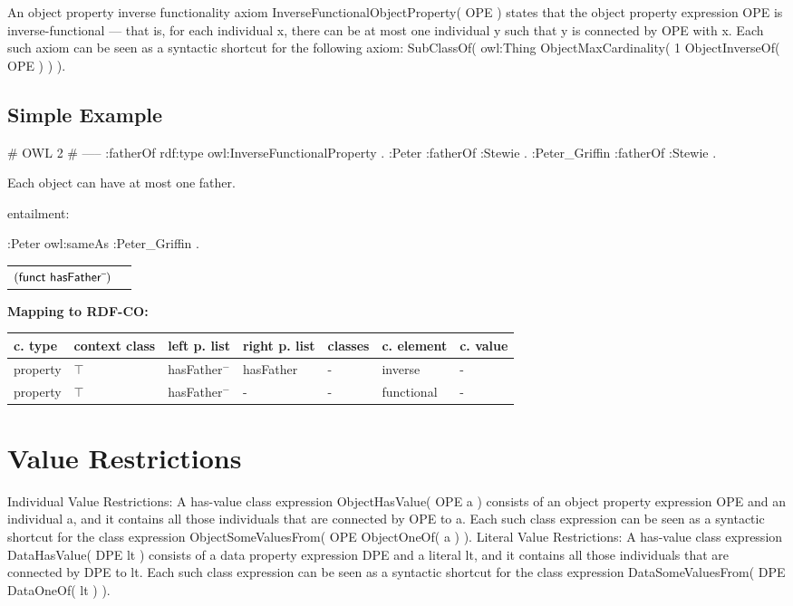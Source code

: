 \documentclass{llncs}
\newenvironment{gcotable}{
  \scriptsize
  \sffamily
  \vspace{0cm}
	\begin{center}
	\textbf{\vspace{0.4cm}Mapping to RDF-CO:} \\
  \begin{tabular}{l|l|l|l|l|l|l}
	\hline
  \textbf{c. type} & \textbf{context class} & \textbf{left p. list} & \textbf{right p. list} & \textbf{classes} & \textbf{c. element} & \textbf{c. value} \\
  \hline

}{
  \hline
  \end{tabular}
	\end{center}
}
\newenvironment{DL}{
  \vspace{0cm}
	\begin{center}
  \begin{tabular}{r l}

}{
  \end{tabular}
	\end{center}
}
\begin{document}
An object property inverse functionality axiom InverseFunctionalObjectProperty( OPE ) states that the object property expression OPE is inverse-functional — that is, for each individual x, there can be at most one individual y such that y is connected by OPE with x. Each such axiom can be seen as a syntactic shortcut for the following axiom: SubClassOf( owl:Thing ObjectMaxCardinality( 1 ObjectInverseOf( OPE ) ) ).

\subsection{Simple Example}

\begin{ex}
# OWL 2
# -----
:fatherOf rdf:type owl:InverseFunctionalProperty . 	
:Peter :fatherOf :Stewie .
:Peter_Griffin :fatherOf :Stewie .
\end{ex}

Each object can have at most one father. 

entailment:

\begin{ex}
:Peter owl:sameAs :Peter_Griffin . 
\end{ex}

\begin{DL}
$(\textsf{funct } \textsf{hasFather}\sp{\overline{\ }})$
\end{DL}

\begin{gcotable}
property & $\top$ & hasFather$^{-}$ & hasFather & - & inverse & - \\
property & $\top$ & hasFather$^{-}$ & - & - & functional & - \\
\end{gcotable}

\section{Value Restrictions}

Individual Value Restrictions: A has-value class expression ObjectHasValue( OPE a ) consists of an object property expression OPE and an individual a, and it contains all those individuals that are connected by OPE to a. Each such class expression can be seen as a syntactic shortcut for the class expression ObjectSomeValuesFrom( OPE ObjectOneOf( a ) ). 
Literal Value Restrictions: A has-value class expression DataHasValue( DPE lt ) consists of a data property expression DPE and a literal lt, and it contains all those individuals that are connected by DPE to lt. Each such class expression can be seen as a syntactic shortcut for the class expression DataSomeValuesFrom( DPE DataOneOf( lt ) ).
\end{document}
